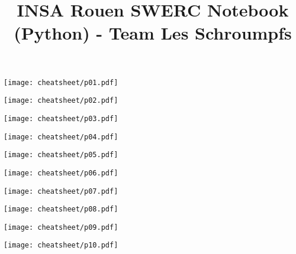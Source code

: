 \documentclass[10pt]{article}
\title{\vspace{-4ex}\Large{INSA Rouen SWERC Notebook (Python) - Team Les Schroumpfs}}
\author{}
\date{}
\begin{document}
\begin{landscape}
\begin{multicols}{2}

\maketitle
\vspace{-13ex}
\tableofcontents
\pagestyle{fancy}



\end{multicols}
\end{landscape}

\centerline{\texttt{[image: cheatsheet/p01.pdf]}}
\centerline{\texttt{[image: cheatsheet/p02.pdf]}}
\centerline{\texttt{[image: cheatsheet/p03.pdf]}}
\centerline{\texttt{[image: cheatsheet/p04.pdf]}}
\centerline{\texttt{[image: cheatsheet/p05.pdf]}}
\centerline{\texttt{[image: cheatsheet/p06.pdf]}}
\centerline{\texttt{[image: cheatsheet/p07.pdf]}}
\centerline{\texttt{[image: cheatsheet/p08.pdf]}}
\centerline{\texttt{[image: cheatsheet/p09.pdf]}}
\centerline{\texttt{[image: cheatsheet/p10.pdf]}}

\newpage
\null
\newpage
\null
\newpage
\null
\end{document}

